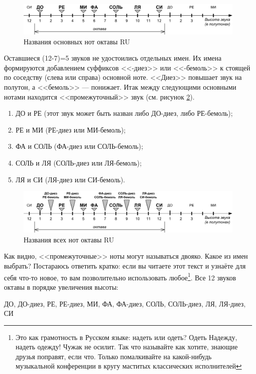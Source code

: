 \begin{figure}[!ht]
    \centering
    \includegraphics[width=\textwidth]{fig/notes/notes-main-ru} 
    \caption{Названия основных нот октавы RU}\label{fig:notes:names:main:RU}
\end{figure} 

Оставшиеся (12-7)=5 звуков не удостоились отдельных имен. Их имена формируются добавлением суффиксов <<-диез>> или <<-бемоль>> к стоящей по соседству (слева или справа) основной ноте. <<Диез>> повышает звук на полутон, а <<бемоль>> --- понижает. Итак между следующими основными нотами находится <<промежуточный>> звук (см. рисунок \ref{fig:notes:names:all:RU}).
\begin{enumerate}
    \item ДО и РЕ (этот звук может быть назван либо ДО-диез, либо РЕ-бемоль);
    \item РЕ и МИ (РЕ-диез или МИ-бемоль);
    \item ФА и СОЛЬ (ФА-диез или СОЛЬ-бемоль);
    \item СОЛЬ и ЛЯ (СОЛЬ-диез или ЛЯ-бемоль);
    \item ЛЯ и СИ (ЛЯ-диез или СИ-бемоль).
\end{enumerate}

\begin{figure}[!ht]
    \centering
    \includegraphics[width=\textwidth]{fig/notes/notes-all-ru} 
    \caption{Названия всех нот октавы RU}\label{fig:notes:names:all:RU}
\end{figure} 

Как видно, <<промежуточные>> ноты могут называться двояко. Какое из имен выбрать? Постараюсь ответить кратко: если вы читаете этот текст и узнаёте для себя что-то новое, то вам позволительно использовать любое\footnote{Это как грамотность в Русском языке: надеть или одеть? Одеть Надежду, надеть одежду! Чужак не осилит. Так что называйте как хотите, знающие друзья поправят, если что. Только помалкивайте на какой-нибудь музыкальной конференции в кругу маститых классических исполнителей}. Все 12 звуков октавы в порядке увеличения высоты:
\begin{center}
    ДО, ДО-диез, РЕ, РЕ-диез, МИ, ФА, ФА-диез, СОЛЬ, СОЛЬ-диез, ЛЯ, ЛЯ-диез, СИ
\end{center}

